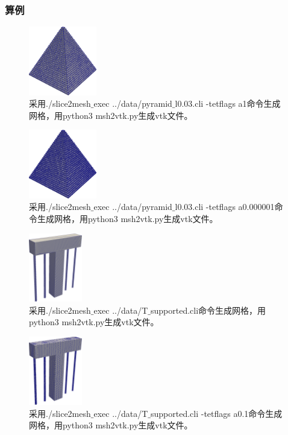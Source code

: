 \subsubsection{算例}

\begin{figure}[!htbp]
  \centering
  \includegraphics[height=3cm]{fig/1/20.png}
  \caption{采用./slice2mesh$\_$exec ../data/pyramid$\_$l0.03.cli -tetflags a1命令生成网格，用python3 msh2vtk.py生成vtk文件。}
  \label{fig:1-7}
\end{figure}

\begin{figure}[!htbp]
  \centering
  \includegraphics[height=3cm]{fig/1/21.png}
  \caption{采用./slice2mesh$\_$exec ../data/pyramid$\_$l0.03.cli -tetflags a0.000001命令生成网格，用python3 msh2vtk.py生成vtk文件。}
  \label{fig:1-7}
\end{figure}

\begin{figure}[!htbp]
  \centering
  \includegraphics[height=3cm]{fig/1/1.1.7.2:3.png}
  \caption{采用./slice2mesh$\_$exec ../data/T$\_$supported.cli命令生成网格，用python3 msh2vtk.py生成vtk文件。}
  \label{fig:1-7}
\end{figure}

\begin{figure}[!htbp]
  \centering
  \includegraphics[height=3cm]{fig/1/1.1.7.2:4.png}
  \caption{采用./slice2mesh$\_$exec ../data/T$\_$supported.cli -tetflags a0.1命令生成网格，用python3 msh2vtk.py生成vtk文件。}
  \label{fig:1-7}
\end{figure}

